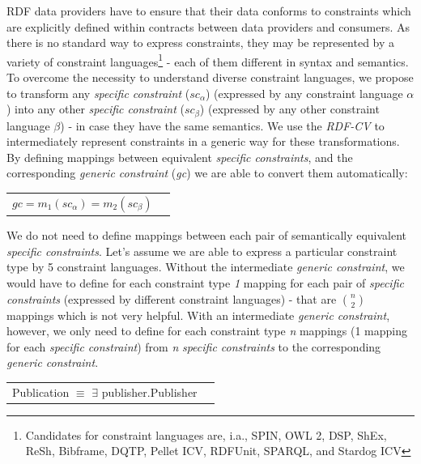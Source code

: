 \documentclass[a4paper,fontsize=11pt]{scrartcl}
\newenvironment{DL}{
  \vspace{0cm}
	\begin{center}
  \begin{tabular}{r l}

}{
  \end{tabular}
	\end{center}
}
\begin{document}
RDF data providers have to ensure that their data conforms to constraints which are explicitly defined within contracts between data providers and consumers.
As there is no standard way to express constraints, they may be represented by a variety of constraint languages\footnote{Candidates for constraint languages are, i.a., SPIN, OWL 2, DSP, ShEx, ReSh, Bibframe, DQTP, Pellet ICV, RDFUnit, SPARQL, and Stardog ICV} - each of them different in syntax and semantics.
To overcome the necessity to understand diverse constraint languages, 
we propose to transform any \emph{specific constraint} (\emph{$sc_{\alpha}$}) (expressed by any constraint language \emph{$\alpha$}) into any other \emph{specific constraint} (\emph{$sc_{\beta}$}) (expressed by any other constraint language \emph{$\beta$}) - in case they have the same semantics.
We use the \emph{RDF-CV} to intermediately represent constraints in a generic way for these transformations.
By defining mappings between equivalent \emph{specific constraints}, and the corresponding \emph{generic constraint} (\emph{gc}) we are able to convert them automatically:

\begin{DL}
$ gc = m_1(sc_{\alpha}) = m_2(sc_{\beta}) $
\end{DL}

We do not need to define mappings between each pair of semantically equivalent \emph{specific constraints}.
Let's assume we are able to express a particular constraint type by 5 constraint languages.
Without the intermediate \emph{generic constraint}, we would have to define for each constraint type \emph{1} mapping for each pair of \emph{specific constraints} (expressed by different constraint languages)
- that are \emph{\( {n \choose 2} \)} mappings which is not very helpful.
With an intermediate \emph{generic constraint}, however, we only need to define for each constraint type \emph{n} mappings (1 mapping for each \emph{specific constraint}) from \emph{n} \emph{specific constraints} to the corresponding \emph{generic constraint}.



\begin{DL}
Publication $\equiv$ $\exists$ publisher.Publisher
\end{DL}
\end{document}
